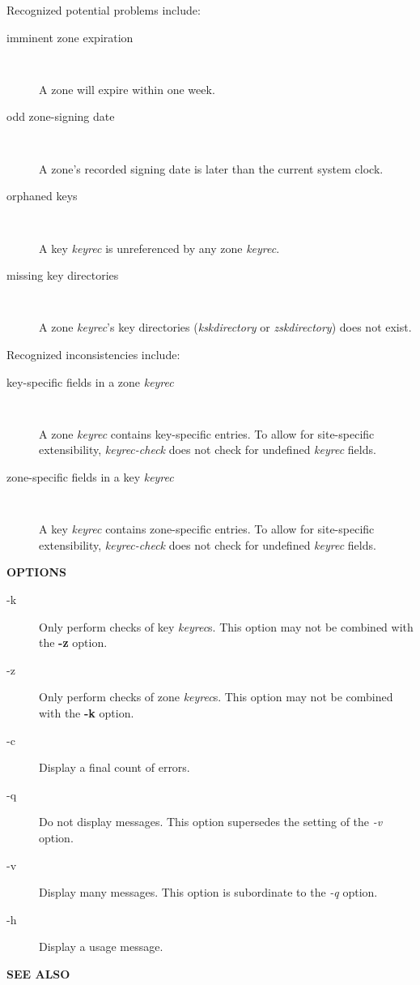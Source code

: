 Recognized potential problems include:

\begin{description}

\item [imminent zone expiration]\verb" "

A zone will expire within one week. 

\item [odd zone-signing date]\verb" "

A zone's recorded signing date is later than the current system clock.

\item [orphaned keys]\verb" "

A key {\it keyrec} is unreferenced by any zone {\it keyrec}.

\item [missing key directories]\verb" "

A zone {\it keyrec}'s key directories ({\it kskdirectory} or {\it zskdirectory}) does
not exist.

\end{description}

Recognized inconsistencies include:

\begin{description}

\item [key-specific fields in a zone {\it keyrec}]\verb" "

A zone {\it keyrec} contains key-specific entries.  To allow for site-specific
extensibility, {\it keyrec-check} does not check for undefined {\it keyrec} fields.

\item [zone-specific fields in a key {\it keyrec}]\verb" "

A key {\it keyrec} contains zone-specific entries.  To allow for site-specific
extensibility, {\it keyrec-check} does not check for undefined {\it keyrec} fields.

\end{description}

{\bf OPTIONS}

\begin{description}

\item [-k] Only perform checks of key {\it keyrec}s.  This option may
not be combined with the {\bf -z} option.

\item [-z] Only perform checks of zone {\it keyrec}s.  This option may
not be combined with the {\bf -k} option.

\item [-c] Display a final count of errors.

\item [-q] Do not display messages.  This option supersedes the setting
of the {\it -v} option.

\item [-v] Display many messages.  This option is subordinate to the
{\it -q} option.

\item [-h] Display a usage message.

\end{description}

{\bf SEE ALSO}


